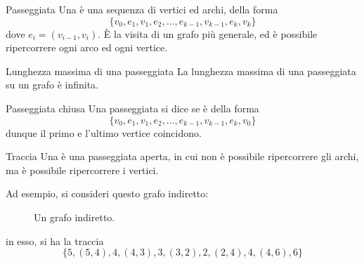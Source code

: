 \documentclass[a4paper, 12pt]{report}
\begin{document}
    \begin{frameddefn}{Passeggiata}
        Una  è una sequenza di vertici ed archi, della forma $$\{v_0, e_1, v_1, e_2, \ldots , e_{k - 1}, v_{k - 1}, e_k, v_k\}$$ dove $e_i=(v_{i - 1}, v_i)$. È la visita di un grafo più generale, ed è possibile ripercorrere ogni arco ed ogni vertice.
    \end{frameddefn}

    \begin{framedobs}{Lunghezza massima di una passeggiata}
        La lunghezza massima di una passeggiata su un grafo è infinita.
    \end{framedobs}

    \begin{frameddefn}{Passeggiata chiusa}
        Una passeggiata si dice  se è della forma $$\{v_0, e_1, v_1, e_2, \ldots , e_{k - 1}, v_{k - 1}, e_k, v_0\}$$ dunque il primo e l'ultimo vertice coincidono. 
    \end{frameddefn}

    \begin{frameddefn}{Traccia}
        Una  è una passeggiata aperta, in cui non è possibile ripercorrere gli archi, ma è possibile ripercorrere i vertici.
    \end{frameddefn}

    \begin{example}
        Ad esempio, si consideri questo grafo indiretto:

        \begin{figure}[H]
            \centering
            \caption{Un grafo indiretto.}
        \end{figure}

        in esso, si ha la traccia $$\{5, (5,4), 4, (4,3), 3, (3, 2), 2, (2,4), 4, (4, 6), 6\}$$
    \end{example}
\end{document}
